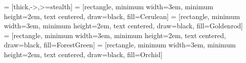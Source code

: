 \usetikzlibrary{shapes.geometric, arrows, chains, fit, tikzmark, calc}
 = [thick,->,>=stealth]
 = [rectangle, minimum width=3em, minimum height=2em, text centered, draw=black, fill=Cerulean]
 = [rectangle, minimum width=3em, minimum height=2em, text centered, draw=black, fill=Goldenrod]
 = [rectangle, minimum width=3em, minimum height=2em, text centered, draw=black, fill=ForestGreen]
 = [rectangle, minimum width=3em, minimum height=2em, text centered, draw=black, fill=Orchid]

